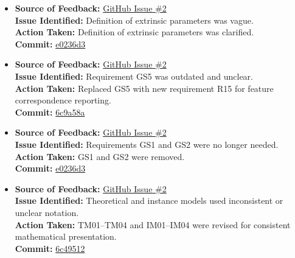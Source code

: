 \documentclass{article}
\begin{document}
\begin{itemize}
  \item \textbf{Source of Feedback:} \href{https://github.com/KiranSingh15/CAS-741-Image-Correspondences/issues/2}{GitHub Issue \#2} \\
  \textbf{Issue Identified:} Definition of extrinsic parameters was vague. \\
  \textbf{Action Taken:} Definition of extrinsic parameters was clarified. \\
  \textbf{Commit:} \href{https://github.com/KiranSingh15/CAS-741-Image-Correspondences/commit/e0236d30165e14926d1cd1169a063d4786d622ed}{e0236d3}

  \item \textbf{Source of Feedback:} \href{https://github.com/KiranSingh15/CAS-741-Image-Correspondences/issues/2}{GitHub Issue \#2} \\
  \textbf{Issue Identified:} Requirement GS5 was outdated and unclear. \\
  \textbf{Action Taken:} Replaced GS5 with new requirement R15 for feature correspondence reporting. \\
  \textbf{Commit:} \href{https://github.com/KiranSingh15/CAS-741-Image-Correspondences/commit/6c9a58a3ec39ec8de9118ef73d7c17ca66b56e96}{6c9a58a}

  \item \textbf{Source of Feedback:} \href{https://github.com/KiranSingh15/CAS-741-Image-Correspondences/issues/2}{GitHub Issue \#2} \\
  \textbf{Issue Identified:} Requirements GS1 and GS2 were no longer needed. \\
  \textbf{Action Taken:} GS1 and GS2 were removed. \\
  \textbf{Commit:} \href{https://github.com/KiranSingh15/CAS-741-Image-Correspondences/commit/e0236d30165e14926d1cd1169a063d4786d622ed}{e0236d3}

  \item \textbf{Source of Feedback:} \href{https://github.com/KiranSingh15/CAS-741-Image-Correspondences/issues/2}{GitHub Issue \#2} \\
  \textbf{Issue Identified:} Theoretical and instance models used inconsistent or unclear notation. \\
  \textbf{Action Taken:} TM01–TM04 and IM01–IM04 were revised for consistent mathematical presentation. \\
  \textbf{Commit:} \href{https://github.com/KiranSingh15/CAS-741-Image-Correspondences/commit/6c49512d687fb1ed972857dcae2e2e3c98af7696}{6c49512}


\end{itemize}
\end{document}
